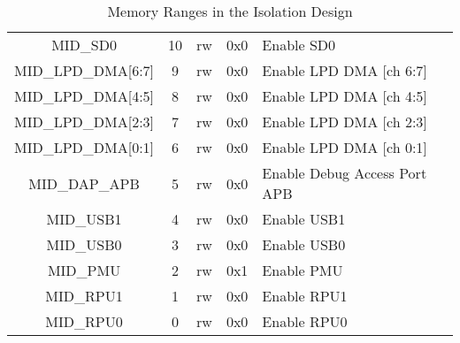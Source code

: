 \begin{table}[ht!]
\begin{tabular}{|c|c|c|c|l|}
      MID\_SD0 & 10 & rw & 0x0 & Enable SD0 \\
      MID\_LPD\_DMA[6:7] & 9 & rw & 0x0 & Enable LPD DMA [ch 6:7] \\
      MID\_LPD\_DMA[4:5] & 8 & rw & 0x0 & Enable LPD DMA [ch 4:5] \\
      MID\_LPD\_DMA[2:3] & 7 & rw & 0x0 & Enable LPD DMA [ch 2:3] \\
      MID\_LPD\_DMA[0:1] & 6 & rw & 0x0 & Enable LPD DMA [ch 0:1] \\
      MID\_DAP\_APB & 5 & rw & 0x0 & Enable Debug Access Port APB \\
      MID\_USB1 & 4 & rw & 0x0 & Enable USB1 \\
      MID\_USB0 & 3 & rw & 0x0 & Enable USB0 \\
      MID\_PMU & 2 & rw & 0x1 & Enable PMU \\
      MID\_RPU1 & 1 & rw & 0x0 & Enable RPU1 \\
      MID\_RPU0 & 0 & rw & 0x0 & Enable RPU0 \\
      \hline
  \end{tabular}
  \caption{Memory Ranges in the Isolation Design}
  \label{table:XMPU_PL_AXI_Masters}
\end{table}